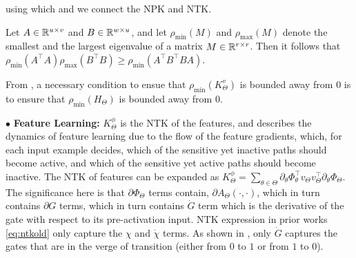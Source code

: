 using which and  we connect the NPK and NTK.
\begin{lemma}\label{lm:nec}
Let $A\in\mathbb{R}^{u\times v}$ and $B\in\mathbb{R}^{w\times u}$, and let $\rho_{\min}(M)$ and $\rho_{\max}(M)$ denote the smallest and the largest eigenvalue of a matrix $M\in\mathbb{R}^{r\times r}$. Then it follows that $\rho_{\min}(A^\top A)\rho_{\max}(B^\top B)\geq \rho_{\min}(A^\top B^\top BA)$.
\end{lemma}
From , a necessary condition to ensue that $\rho_{\min}(K^v_{\Theta})$ is bounded away from $0$ is to ensure that $\rho_{\min}(H_{\Theta})$ is bounded away from $0$.\\

$\bullet$ \textbf{Feature Learning:} $K^{\phi}_{\Theta}$ is the NTK of the features, and describes the dynamics of feature learning due to the flow of the feature gradients, which, for each input example decides, which of the sensitive yet inactive paths should become active, and which of the sensitive yet active paths should become inactive. The NTK of features can be expanded as $K^{\phi}_{\Theta}=\sum_{\theta \in \Theta}\partial_{\theta} \Phi^\top_{\theta}v_{\Theta}v^\top_{\Theta}\partial_{\theta}\Phi_{\Theta}$. The significance here is that $\partial \Phi_{\Theta}$ terms contain, $\partial A_{\Theta}(\cdot,\cdot)$, which in turn contains $\partial G$ terms, which in turn contains $\dot{G}$ term which is the derivative of the gate with respect to its pre-activation input. NTK expression in prior works \eqref{eq:ntkold} only capture the $\chi$ and $\dot{\chi}$ terms. As shown in , only $\dot{G}$ captures the gates that are in the verge of transition (either from $0$ to $1$ or from $1$ to $0$).
